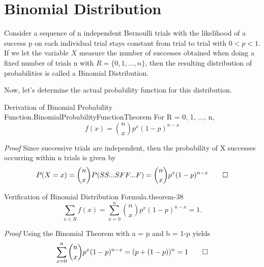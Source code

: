 \documentclass[10pt,]{book}
\makeatletter
\renewcommand*{\proofname}{Proof}
\renewenvironment{proof}[1][\proofname]{\par
  \pushQED{\qed}%
  \normalfont \topsep6\p@\@plus6\p@\relax
  \trivlist
  \item\relax
    {\itshape
    #1\@addpunct{.}}\hspace\labelsep\ignorespaces
}{%
  \popQED\endtrivlist\@endpefalse
}
\numberwithin{equation}{section}
\newcommand{\lt}{<}
\makeatother
\begin{document}
\section[{Binomial Distribution}]{Binomial Distribution}\label{section-46}
\hypertarget{p-886}{}%
Consider a sequence  of n independent Bernoulli trials with the likelihood of a success p on each individual trial stays constant from trial to trial with \(0 \lt p \lt 1 \). If we let the variable \(X\) measure the number of successes obtained when doing a fixed number of trials n with \(R = \{ 0, 1, ..., n \}\), then the resulting distribution of probabilities is called a Binomial Distribution.%
\par
\hypertarget{p-887}{}%
Now, let's determine the actual probability function for this distribution.%
\par
\hypertarget{p-888}{}%
\begin{theorem}{Derivation of Binomial Probability Function.}{}{BinomialProbabilityFunctionTheorem}%
\hypertarget{BinomialProbabilityFunction}{}%
For R = {0, 1, ..., n},%
\begin{equation*}
f(x) = \binom{n}{x}p^x(1-p)^{n-x}
\end{equation*}
%
\end{theorem}
\begin{proof}\hypertarget{proof-39}{}
\hypertarget{p-890}{}%
Since successive trials are independent, then the probability of X successes occurring within n trials is given by%
\begin{equation*}
P(X=x) = \binom{n}{x}P(SS...SFF...F) = 		
\binom{n}{x}p^x(1-p)^{n-x}\qedhere
\end{equation*}
%
\end{proof}
%
\par
\hypertarget{p-891}{}%
\begin{theorem}{Verification of Binomial Distribution Formula.}{}{theorem-38}%
\hypertarget{p-892}{}%
%
\begin{equation*}
\sum_{x \in R} f(x) = \sum_{x=0}^n \binom{n}{x}p^x(1-p)^{n-x} = 1.
\end{equation*}
%
\end{theorem}
\begin{proof}\hypertarget{proof-40}{}
\hypertarget{p-893}{}%
Using the Binomial Theorem with a = p and b = 1-p yields%
\begin{equation*}
\sum_{x=0}^n \binom{n}{x}p^x(1-p)^{n-x} = (p + (1-p))^n = 1\qedhere
\end{equation*}
%
\end{proof}
%
\par
\end{document}

